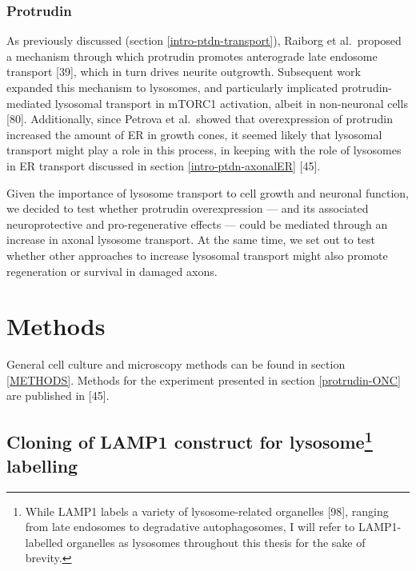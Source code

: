 \documentclass[
  12pt,
  a4paper,
]{book}
\begin{document}
\hypertarget{protrudin}{%
\subsubsection{Protrudin}\label{protrudin}}

As previously discussed (section \ref{intro-ptdn-transport}), Raiborg et al.~proposed a mechanism through which protrudin promotes anterograde late endosome transport {[}39{]}, which in turn drives neurite outgrowth. Subsequent work expanded this mechanism to lysosomes, and particularly implicated protrudin-mediated lysosomal transport in mTORC1 activation, albeit in non-neuronal cells {[}80{]}. Additionally, since Petrova et al.~showed that overexpression of protrudin increased the amount of ER in growth cones, it seemed likely that lysosomal transport might play a role in this process, in keeping with the role of lysosomes in ER transport discussed in section \ref{intro-ptdn-axonalER} {[}45{]}.

Given the importance of lysosome transport to cell growth and neuronal function, we decided to test whether protrudin overexpression --- and its associated neuroprotective and pro-regenerative effects --- could be mediated through an increase in axonal lysosome transport. At the same time, we set out to test whether other approaches to increase lysosomal transport might also promote regeneration or survival in damaged axons.

\hypertarget{methods}{%
\section{Methods}\label{methods}}

General cell culture and microscopy methods can be found in section \ref{METHODS}. Methods for the experiment presented in section \ref{protrudin-ONC} are published in {[}45{]}.

\hypertarget{cloning}{%
\subsection[Cloning of LAMP1 construct for lysosome labelling]{\texorpdfstring{Cloning of LAMP1 construct for lysosome\footnote{While LAMP1 labels a variety of lysosome-related organelles {[}98{]}, ranging from late endosomes to degradative autophagosomes, I will refer to LAMP1-labelled organelles as lysosomes throughout this thesis for the sake of brevity.} labelling}{Cloning of LAMP1 construct for lysosome labelling}}\label{cloning}}
\end{document}
